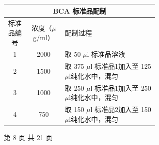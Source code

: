 \documentclass[UTF8,10pt,a4paper,fontset=fandol]{ctexart}
\newcommand{\fieldvalue}[1]{#1}
\newcommand{\handwritten}[1]{#1}
\begin{document}
\vspace{2mm}

\begin{tabular}{|c|c|p{0.62\linewidth}|}
\hline
\multicolumn{3}{|c|}{BCA 标准品配制} \\
\hline
标准品编号 & 浓度（$\mu$g/ml） & 配制过程 \\
\hline
1 & 2000 &
取
\fieldvalue{\handwritten{50}}
 $\mu$l 标准品溶液 \\
\hline
2 & 1500 &
取
\fieldvalue{\handwritten{375}}
 $\mu$l 标准品1加入至
\fieldvalue{\handwritten{125}}
 $\mu$l纯化水中，混匀 \\
\hline
3 & 1000 &
取
\fieldvalue{\handwritten{250}}
 $\mu$l 标准品1加入至
\fieldvalue{\handwritten{250}}
 $\mu$l纯化水中，混匀 \\
\hline
4 & 750 &
取
\fieldvalue{\handwritten{150}}
 $\mu$l 标准品2加入至
\fieldvalue{\handwritten{150}}
 $\mu$l纯化水中，混匀 \\
\hline
\end{tabular}

\begin{center}
第 8 页 共 21 页
\end{center}

\newpage

\small
\end{document}

